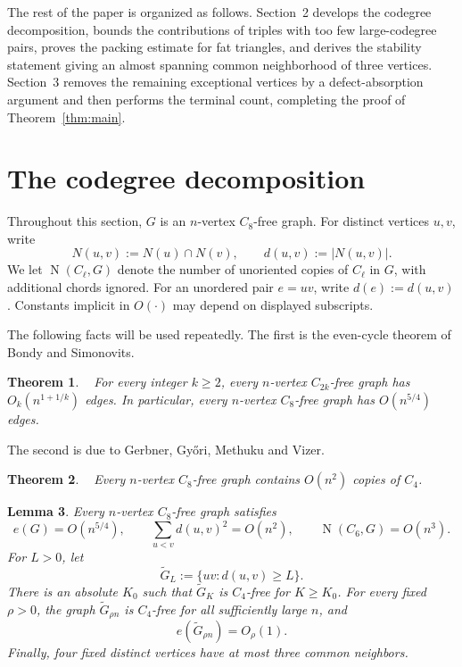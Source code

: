 \documentclass[11pt,letterpaper]{article}
\newtheorem{theorem}{Theorem}[section]
\newtheorem{lemma}[theorem]{Lemma}
\newcommand{\N}{\operatorname{N}}
\begin{document}
The rest of the paper is organized as follows. Section~2 develops the codegree decomposition, bounds the contributions of triples with too few large-codegree pairs, proves the packing estimate for fat triangles, and derives the stability statement giving an almost spanning common neighborhood of three vertices. Section~3 removes the remaining exceptional vertices by a defect-absorption argument and then performs the terminal count, completing the proof of Theorem~\ref{thm:main}.

\section{The codegree decomposition}

Throughout this section, \(G\) is an \(n\)-vertex \(C_8\)-free graph. For distinct vertices \(u,v\), write
\[
  N(u,v):=N(u)\cap N(v),\qquad d(u,v):=|N(u,v)|.
\]
We let \(\N(C_\ell,G)\) denote the number of unoriented copies of \(C_\ell\) in \(G\), with additional
chords ignored. For an unordered pair \(e=uv\), write \(d(e):=d(u,v)\). Constants implicit in
\(O(\cdot)\) may depend on displayed subscripts.

The following facts will be used repeatedly. The first is the even-cycle theorem of Bondy and
Simonovits.

\begin{theorem}\label{thm:bondy-simonovits}~\cite{BondySimonovits1974}
For every integer \(k\ge2\), every \(n\)-vertex \(C_{2k}\)-free graph has \(O_k(n^{1+1/k})\)
edges. In particular, every \(n\)-vertex \(C_8\)-free graph has \(O(n^{5/4})\) edges.
\end{theorem}

The second is due to Gerbner, Gy\H{o}ri, Methuku and Vizer.

\begin{theorem}\label{thm:ggmv-c4}~\cite{GerbnerGyoriMethukuVizer2020}
Every \(n\)-vertex \(C_8\)-free graph contains \(O(n^2)\) copies of \(C_4\).
\end{theorem}

\begin{lemma}\label{lem:basic}
  Every \(n\)-vertex \(C_8\)-free graph satisfies
  \[
    e(G)=O(n^{5/4}),\qquad
    \sum_{u<v}d(u,v)^2=O(n^2),\qquad
    \N(C_6,G)=O(n^3).
  \]
  For \(L>0\), let
  \[
    \tilde{G}_L:=\{uv:d(u,v)\ge L\}.
  \]
  There is an absolute \(K_0\) such that \(\tilde{G}_K\) is \(C_4\)-free for \(K\ge K_0\). For every fixed
  \(\rho>0\), the graph \(\tilde{G}_{\rho n}\) is \(C_4\)-free for all sufficiently large \(n\), and
  \[
    e(\tilde{G}_{\rho n})=O_\rho(1).
  \]
  Finally, four fixed distinct vertices have at most three common neighbors.
\end{lemma}
\end{document}
